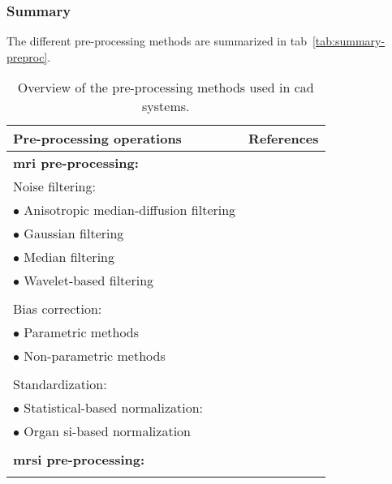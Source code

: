 
\subsubsection{Summary}

The different pre-processing methods are summarized in \acs{tab}~\ref{tab:summary-preproc}.

\begin{table}
  \caption{Overview of the pre-processing methods used in \acs*{cad} systems.}
  \scriptsize
  \centering
  \begin{tabular}{l r}
    \toprule
    \textbf{Pre-processing operations} & \textbf{References} \\
    \midrule
    \textbf{\ac{mri} pre-processing:} & \\
    \quad Noise filtering: &  \\
    \quad \quad $\bullet$ Anisotropic median-diffusion filtering & \cite{rampun2015classifying,rampun2015computer,rampun2016computer,rampun2016computerb,rampun2016quantitative}  \\
    \quad \quad $\bullet$ Gaussian filtering & \cite{samarasinghe2016semi}  \\
    \quad \quad $\bullet$ Median filtering & \cite{Ozer2009,Ozer2010}  \\
    \quad \quad $\bullet$ Wavelet-based filtering & \cite{Ampeliotis2007,Ampeliotis2008,Lopes2011} \\ \\ [-1.5ex]
    \quad Bias correction: & \\
    \quad \quad $\bullet$ Parametric methods & \cite{Lv2009,Viswanath2009,giannini2015fully} \\
    \quad \quad $\bullet$ Non-parametric methods & \cite{Viswanath2011} \\ \\ [-1.5ex]
    \quad Standardization: & \\
    \quad \quad $\bullet$ Statistical-based normalization: & \cite{Artan2009,Artan2010,Lv2009,Ozer2009,Ozer2010,rampun2015classifying,rampun2015computer,rampun2016computer,rampun2016computerb,rampun2016quantitative,Viswanath2009,Viswanath2011,Viswanath2012} \\
    \quad \quad $\bullet$ Organ \ac{si}-based normalization & \cite{Niaf2011,Niaf2012,lehaire2014computer,samarasinghe2016semi} \\ \\ [-1.5ex]
    \textbf{\ac{mrsi} pre-processing:} & \\ \\ [-1.5ex]

\end{tabular}
\end{table}
